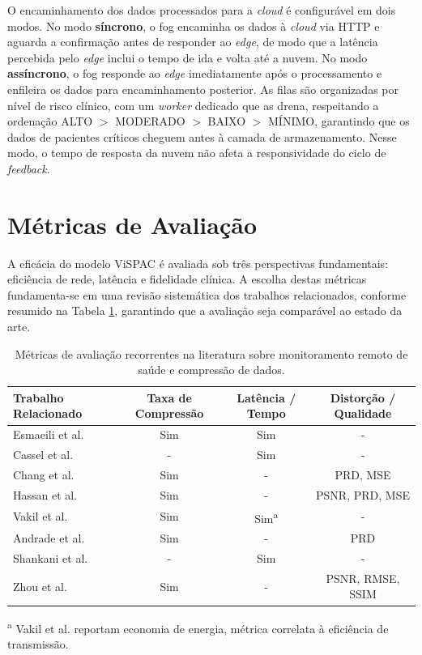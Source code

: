 \documentclass[twoside,english,brazilian]{UNISINOSmonografia}
\begin{document}
O encaminhamento dos dados processados para a \textit{cloud} é configurável em dois modos. No modo \textbf{síncrono}, o fog encaminha os dados à \textit{cloud} via HTTP e aguarda a confirmação antes de responder ao \textit{edge}, de modo que a latência percebida pelo \textit{edge} inclui o tempo de ida e volta até a nuvem. No modo \textbf{assíncrono}, o fog responde ao \textit{edge} imediatamente após o processamento e enfileira os dados para encaminhamento posterior. As filas são organizadas por nível de risco clínico, com um \textit{worker} dedicado que as drena, respeitando a ordenação ALTO $>$ MODERADO $>$ BAIXO $>$ MÍNIMO, garantindo que os dados de pacientes críticos cheguem antes à camada de armazenamento. Nesse modo, o tempo de resposta da nuvem não afeta a responsividade do ciclo de \textit{feedback}.

\section{Métricas de Avaliação}
\label{sec:metricas}

A eficácia do modelo ViSPAC é avaliada sob três perspectivas fundamentais: eficiência de rede, latência e fidelidade clínica. A escolha destas métricas fundamenta-se em uma revisão sistemática dos trabalhos relacionados, conforme resumido na Tabela \ref{tab:verificacao_metricas}, garantindo que a avaliação seja comparável ao estado da arte.

\begin{table}[h!]
\centering
\caption{Métricas de avaliação recorrentes na literatura sobre monitoramento remoto de saúde e compressão de dados.}
\label{tab:verificacao_metricas}
\footnotesize 
\setlength{\tabcolsep}{3pt} 
\begin{tabular}{|l|c|c|c|}
\hline
\textbf{Trabalho Relacionado} & \textbf{Taxa de Compressão} & \textbf{Latência / Tempo} & \textbf{Distorção / Qualidade} \\ \hline
Esmaeili et al. \cite{ESMAEILI2023} & Sim & Sim & - \\ \hline
Cassel et al. \cite{CASSEL2024}     & -   & Sim & - \\ \hline
Chang et al. \cite{Chang2024}       & Sim & -   & PRD, MSE \\ \hline
Hassan et al. \cite{Hassan2024}     & Sim & -   & PSNR, PRD, MSE \\ \hline
Vakil et al. \cite{Vakil2024}       & Sim & Sim\textsuperscript{a} & - \\ \hline
Andrade et al. \cite{Andrade2025}   & Sim & -   & PRD \\ \hline
Shankani et al. \cite{Shankani2025} & -   & Sim & - \\ \hline
Zhou et al. \cite{Zhou2025}         & Sim & -   & PSNR, RMSE, SSIM \\ \hline
\end{tabular}
\vspace{4pt}

\textsuperscript{a} Vakil et al. reportam economia de energia, métrica correlata à eficiência de transmissão.

\end{table}
\end{document}
